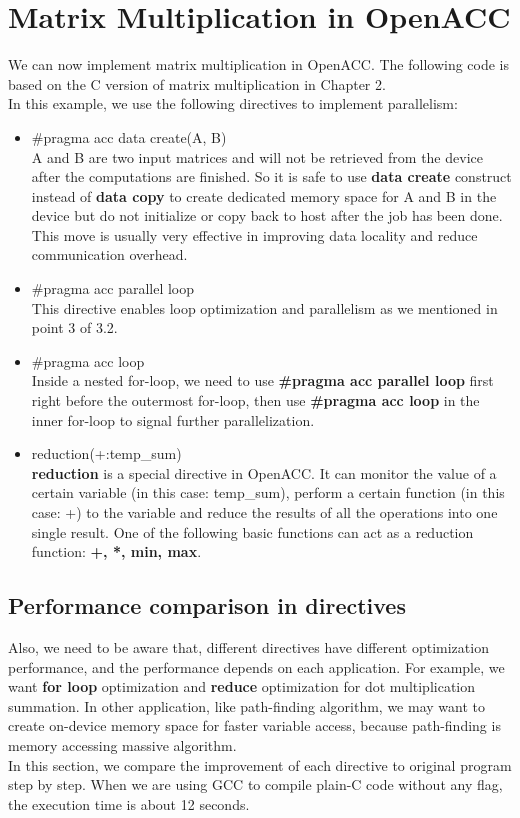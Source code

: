\documentclass[ebook,10pt,oneside,openany]{memoir}
\begin{document}
\section{Matrix Multiplication in OpenACC}
We can now implement matrix multiplication in OpenACC. The following code is based on the C version of matrix multiplication in Chapter 2. \\


In this example, we use the following directives to implement parallelism:
\begin{itemize}
\item \#pragma acc data create(A, B) \\
A and B are two input matrices and will not be retrieved from the device after the computations are finished. So it is safe to use \textbf{data create} construct instead of \textbf{data copy} to create dedicated memory space for A and B in the device but do not initialize or copy back to host after the job has been done. This move is usually very effective in improving data locality and reduce communication overhead.
\item \#pragma acc parallel loop\\
This directive enables loop optimization and parallelism as we mentioned in point 3 of 3.2.
\item \#pragma acc loop \\
Inside a nested for-loop, we need to use \textbf{\#pragma acc parallel loop} first right before the outermost for-loop, then use \textbf{ \#pragma acc loop} in the inner for-loop to signal further parallelization.
\item reduction(+:temp\_sum) \\
\textbf{reduction} is a special directive in OpenACC. It can monitor the value of a certain variable (in this case: temp\_sum), perform a certain function (in this case: +) to the variable and reduce the results of all the operations into one single result. One of the following basic functions can act as a reduction function: \textbf{+, *, min, max}.
\end{itemize}

\subsection{Performance comparison in directives}
Also, we need to be aware that, different directives have different optimization performance, and the performance depends on each application. For example, we want \textbf{for loop} optimization and \textbf{reduce} optimization for dot multiplication summation. In other application, like path-finding algorithm, we may want to create on-device memory space for faster variable access, because path-finding is memory accessing massive algorithm. \\
In this section, we compare the improvement of each directive to original program step by step. When we are using GCC to compile plain-C code without any flag, the execution time is about 12 seconds.
\end{document}

